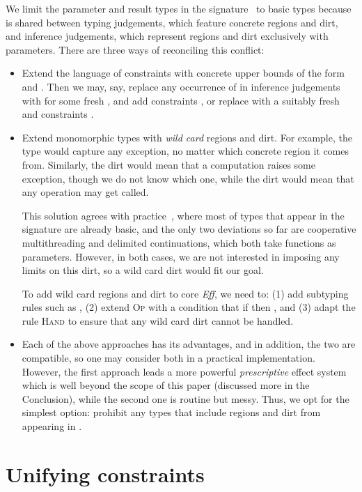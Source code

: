 \documentclass{LMCS}
\newcommand{\rulename}[1]{{\mdseries \small \textsc{#1}}}
\newcommand{\Eff}{\emph{Eff}\xspace}
\begin{document}
\begin{rem}
\label{rem:glitch}
We limit the parameter and result types in the signature~ to basic types
because  is shared between typing judgements, which feature concrete regions and dirt,
and inference judgements, which represent regions and dirt exclusively with parameters.
There are three ways of reconciling this conflict:
\begin{itemize}
\item
  Extend the language of constraints with concrete upper bounds of the form  and .
  Then we may, say, replace any occurrence of  in inference judgements
  with  for some fresh ,
  and add constraints ,
  or replace 
  with a suitably fresh  and
  constraints .
\item
  Extend monomorphic types with \emph{wild card} regions and dirt.
  For example, the type  would capture any exception,
  no matter which concrete region it comes from.
  Similarly, the dirt  would mean that a computation raises some exception,
  though we do not know which one,
  while the dirt  would mean that any operation may get called.

  This solution agrees with practice~\cite{bauer2012programming},
  where most of types that appear in the signature are already basic,
  and the only two deviations so far are cooperative multithreading and delimited continuations,
  which both take functions as parameters.
  However, in both cases, we are not interested in imposing any limits on this dirt,
  so a wild card dirt would fit our goal.

  To add wild card regions and dirt to core \Eff, we need to:
  (1) add subtyping rules such as ,
  (2) extend \rulename{Op} with a condition that if  then ,
  and (3) adapt the rule \rulename{Hand} to ensure that any wild card dirt cannot be handled.
\item
  Each of the above approaches has its advantages,
  and in addition, the two are compatible,
  so one may consider both in a practical implementation.
  However,
  the first approach leads a more powerful \emph{prescriptive} effect system
  which is well beyond the scope of this paper
  (discussed more in the Conclusion),
  while the second one is routine but messy.
  Thus, we opt for the simplest option:
  prohibit any types that include regions and dirt from appearing in .
\end{itemize}
\end{rem}

\section{Unifying constraints}
\label{sec:unifying}
\end{document}

